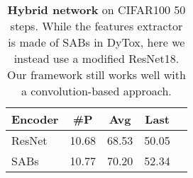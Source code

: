 \begin{table}[t]
    \centering
    \begin{tabular}{@{}l|cccc@{}}
        \hline
        Encoder & \textbf{\#P} & \textbf{Avg} & \textbf{Last} \Tstrut\Bstrut \\
        \hline
        ResNet  & 10.68        & 68.53        & 50.05\Tstrut                 \\
        SABs    & 10.77        & 70.20        & 52.34\Bstrut                 \\
        \hline
    \end{tabular}
    \caption{\textbf{Hybrid network} on CIFAR100 50 steps. While the features extractor is made of
        SABs in DyTox, here we instead use a modified ResNet18. Our framework still works well with a
        convolution-based approach.}
    \label{tab:dytox_resnet}
\end{table}
